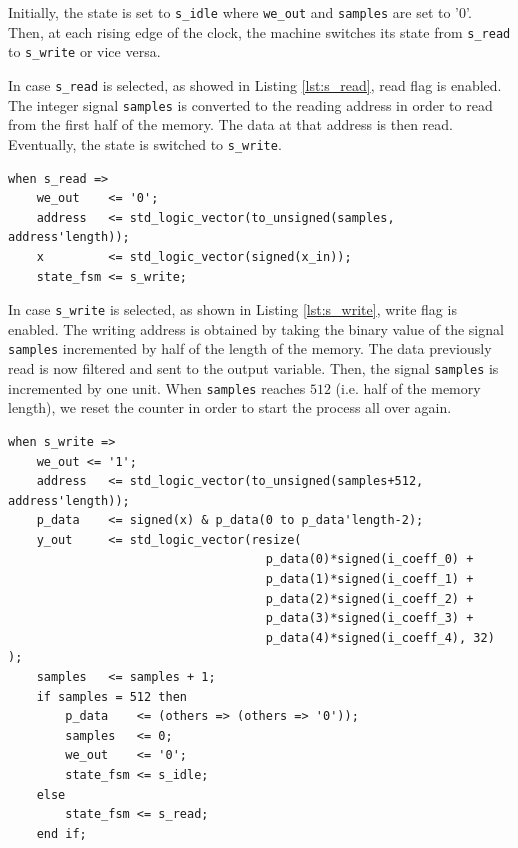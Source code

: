 \documentclass[11pt, a4paper]{article}
\begin{document}
Initially, the state is set to {\footnotesize\texttt{s\_idle}}  where  {\footnotesize\texttt{we\_out}} and {\footnotesize\texttt{samples}} are set to '0'.
Then, at each rising edge of the clock, the machine switches its state from {\footnotesize\texttt{s\_read}} to {\footnotesize\texttt{s\_write}} or vice versa. 

In case {\footnotesize\texttt{s\_read}} is selected, as showed in Listing \ref{lst:s_read}, read flag is enabled. The integer signal {\footnotesize\texttt{samples}} is converted to the reading address in order to read from the first half of the memory. The data at that address is then read. Eventually, the state is switched to {\footnotesize\texttt{s\_write}}.

\begin{lstlisting}[style=vhdl,label={lst:s_read},caption={Read state of the finite state machine.}]
when s_read =>
    we_out    <= '0';
    address   <= std_logic_vector(to_unsigned(samples, address'length));
    x         <= std_logic_vector(signed(x_in));
    state_fsm <= s_write;
\end{lstlisting}

In case {\footnotesize\texttt{s\_write}} is selected, as shown in Listing \ref{lst:s_write}, write flag is enabled. The writing address is obtained by taking the binary value of the signal {\footnotesize\texttt{samples}} incremented by half of the length of the memory. The data previously read is now filtered and sent to the output variable. Then, the signal {\footnotesize\texttt{samples}} is incremented by one unit. When {\footnotesize\texttt{samples}} reaches \(512\) (i.e. half of the memory length), we reset the counter in order to start the process all over again. 

\begin{lstlisting}[style=vhdl,label={lst:s_write},caption={Write state of the finite state machine.}]
when s_write =>
	we_out <= '1';
	address   <= std_logic_vector(to_unsigned(samples+512, address'length));
	p_data    <= signed(x) & p_data(0 to p_data'length-2);
	y_out     <= std_logic_vector(resize(
                                    p_data(0)*signed(i_coeff_0) +
                                    p_data(1)*signed(i_coeff_1) +
                                    p_data(2)*signed(i_coeff_2) +
                                    p_data(3)*signed(i_coeff_3) +
                                    p_data(4)*signed(i_coeff_4), 32) );
	samples   <= samples + 1;
	if samples = 512 then
		p_data    <= (others => (others => '0'));
		samples   <= 0;
		we_out    <= '0';
		state_fsm <= s_idle;
	else
		state_fsm <= s_read;
	end if;
\end{lstlisting}
\end{document}
